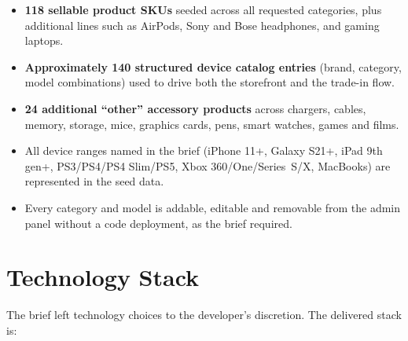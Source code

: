 \documentclass[11pt,a4paper]{article}
\begin{document}
\begin{itemize}
  \item \textbf{118 sellable product SKUs} seeded across all requested categories, plus additional lines such as AirPods, Sony and Bose headphones, and gaming laptops.
  \item \textbf{Approximately 140 structured device catalog entries} (brand, category, model combinations) used to drive both the storefront and the trade-in flow.
  \item \textbf{24 additional ``other'' accessory products} across chargers, cables, memory, storage, mice, graphics cards, pens, smart watches, games and films.
  \item All device ranges named in the brief (iPhone 11+, Galaxy S21+, iPad 9th gen+, PS3/PS4/PS4 Slim/PS5, Xbox 360/One/Series~S/X, MacBooks) are represented in the seed data.
  \item Every category and model is addable, editable and removable from the admin panel without a code deployment, as the brief required.
\end{itemize}

\section{Technology Stack}

The brief left technology choices to the developer's discretion. The delivered stack is:
\end{document}
